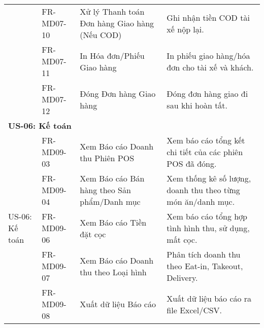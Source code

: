 \begin{longtable}{|m{2.5cm}|m{2.5cm}|m{5cm}|m{5cm}|}
	                                                        & FR-MD07-10            & Xử lý Thanh toán Đơn hàng Giao hàng (Nếu COD)          & Ghi nhận tiền COD tài xế nộp lại.                                                           \\
	                                                        & FR-MD07-11            & In Hóa đơn/Phiếu Giao hàng                             & In phiếu giao hàng/hóa đơn cho tài xế và khách.                                             \\
	                                                        & FR-MD07-12            & Đóng Đơn hàng Giao hàng                                & Đóng đơn hàng giao đi sau khi hoàn tất.                                                     \\
	\hline

	\multicolumn{4}{|l|}{\textbf{US-06: Kế toán}}                                                                                                                                                                                          \\ \hline
	\multirow{5}{=}[2pt]{US-06: Kế toán}                    & FR-MD09-03            & Xem Báo cáo Doanh thu Phiên POS                        & Xem báo cáo tổng kết chi tiết của các phiên POS đã đóng.                                    \\
	                                                        & FR-MD09-04            & Xem Báo cáo Bán hàng theo Sản phẩm/Danh mục            & Xem thống kê số lượng, doanh thu theo từng món ăn/danh mục.                                 \\
	                                                        & FR-MD09-06            & Xem Báo cáo Tiền đặt cọc                               & Xem báo cáo tổng hợp tình hình thu, sử dụng, mất cọc.                                       \\
	                                                        & FR-MD09-07            & Xem Báo cáo Doanh thu theo Loại hình                   & Phân tích doanh thu theo Eat-in, Takeout, Delivery.                                         \\
	                                                        & FR-MD09-08            & Xuất dữ liệu Báo cáo                                   & Xuất dữ liệu báo cáo ra file Excel/CSV.                                                     \\
	\hline


\end{longtable}
